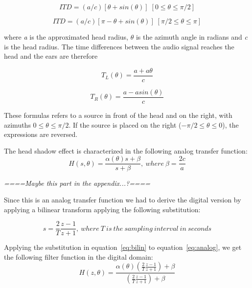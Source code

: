\documentclass[journal]{IEEEtran}
\begin{document}
\begin{equation}\label{eq:ITDfront}
ITD = (a/c)[\theta + sin(\theta)]   \; [0 \leq \theta \leq \pi/2]
\end{equation}

\begin{equation}\label{eq:ITDback}
ITD = (a/c)[\pi - \theta + sin(\theta)]  \; [\pi/2 \leq \theta \leq \pi]
\end{equation}


where \textit{a} is the approximated head radius, $\theta$ is the azimuth angle in radians and \textit{c} is the head radius. The time differences between the audio signal reaches the head and the ears are therefore

\begin{equation}\label{eq:ITDL}
T_{L} (\theta) = \frac{a+a\theta}{c}
\end{equation}

\begin{equation}\label{eq:ITDR}
T_{R} (\theta) = \frac{a-a sin(\theta)}{c}
\end{equation}

These formulas refers to a source in front of the head and on the right, with azimuths $0 \leq \theta \leq \pi/2$. If the source is placed on the right ($- \pi/2 \leq \theta \leq 0$), the expressions are reversed.



 The head shadow effect is characterized in the following analog transfer function:
\begin{equation}\label{eq:analog}
H\left( s,\theta\right) = \frac{\alpha (\theta)s+\beta}{s+\beta},\: where\:\beta = \frac{2c}{a}
\end{equation}


\emph{====Maybe this part in the appendix...?====}

Since this is an analog transfer function we had to derive the digital version by applying a bilinear transform applying the following substitution:

\begin{equation}\label{eq:bilin}
s = \frac{2}{T} \frac{z-1}{z+1},\: where\:T\:is\:the\:sampling\:interval\:in\:seconds
\end{equation}

Applying the substitution in equation~\ref{eq:bilin} to equation~\ref{eq:analog}, we get the following filter function in the digital domain:
\begin{equation}\label{eq:filter}
H\left( z,\theta\right) = \frac{\alpha (\theta)(\frac{2}{T} \frac{z-1}{z+1})+\beta}{(\frac{2}{T} \frac{z-1}{z+1})+\beta}
\end{equation}
\end{document}
